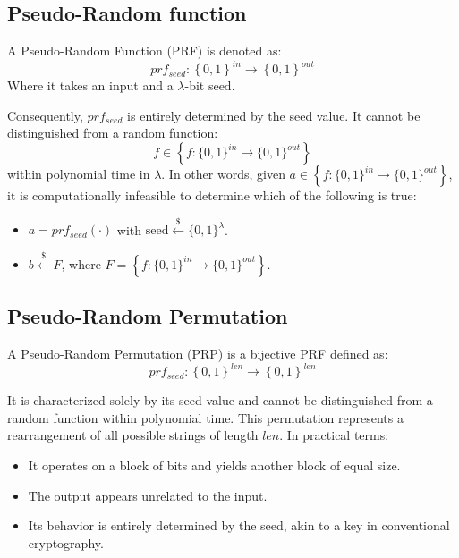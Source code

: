 \subsection{Pseudo-Random function}
\begin{definition}
    A Pseudo-Random Function (PRF) is denoted as: 
    \[prf_{seed}:\left\{ 0,1 \right\}^{in} \rightarrow \left\{ 0,1 \right\}^{out}\]
    Where it takes an input and a $\lambda$-bit seed.
\end{definition}
Consequently, $prf_{seed}$ is entirely determined by the seed value.
It cannot be distinguished from a random function: 
\[ f \in \left\{ f:\{ 0,1 \}^{in} \rightarrow \{ 0,1 \}^{out}\right\}\]
within polynomial time in $\lambda$.
In other words, given $a \in \left\{ f:\{ 0,1 \}^{in} \rightarrow \{ 0,1 \}^{out}\right\}$, it is computationally infeasible to determine which of the following is true:
\begin{itemize}
    \item $a=prf_{seed}(\cdot)$ with $\text{seed}\overset{\$}{\leftarrow}\{0,1\}^\lambda$. 
    \item $b\overset{\$}{\leftarrow}F$, where $F=\left\{ f:\{ 0,1 \}^{in} \rightarrow \{ 0,1 \}^{out}\right\}$.
\end{itemize}

\subsection{Pseudo-Random Permutation}
\begin{definition}
    A Pseudo-Random Permutation (PRP) is a bijective PRF defined as:
    \[prf_{seed}:\left\{ 0,1 \right\}^{len}\rightarrow\left\{ 0,1 \right\}^{len}\]
\end{definition}
It is characterized solely by its seed value and cannot be distinguished from a random function within polynomial time.
This permutation represents a rearrangement of all possible strings of length $len$.
In practical terms:
\begin{itemize}
    \item It operates on a block of bits and yields another block of equal size.
    \item The output appears unrelated to the input.
    \item Its behavior is entirely determined by the seed, akin to a key in conventional cryptography.
\end{itemize}

